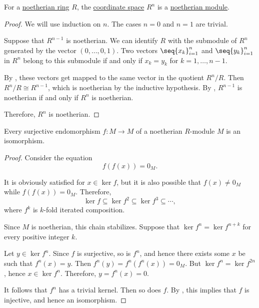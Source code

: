 \begin{proposition}\label{thm:noetherian_free_module}
  For a \hyperref[def:noetherian_semiring]{noetherian ring} \( R \), the \hyperref[def:sequence_space]{coordinate space} \( R^n \) is a \hyperref[def:noetherian_semimodule]{noetherian module}.
\end{proposition}
\begin{proof}
  We will use induction on \( n \). The cases \( n = 0 \) and \( n = 1 \) are trivial.

  Suppose that \( R^{n-1} \) is noetherian. We can identify \( R \) with the submodule of \( R^n \) generated by the vector \( (0, \ldots, 0, 1) \). Two vectors \( \seq{ x_k }_{i=1}^n \) and  \( \seq{ y_k }_{i=1}^n \) in \( R^n \) belong to this submodule if and only if \( x_k = y_k \) for \( k = 1, \ldots, n - 1 \).

  By , these vectors get mapped to the same vector in the quotient \( R^n / R \). Then \( R^n / R \cong R^{n-1} \), which is noetherian by the inductive hypothesis. By , \( R^{n-1} \) is noetherian if and only if \( R^n \) is noetherian.

  Therefore, \( R^n \) is noetherian.
\end{proof}

\begin{lemma}\label{thm:surjective_endomorphism_over_noetherian_module}
  Every surjective endomorphism \( f: M \to M \) of a noetherian \( R \)-module \( M \) is an isomorphism.
\end{lemma}
\begin{proof}
  Consider the equation
  \begin{equation*}
    f(f(x)) = 0_M.
  \end{equation*}

  It is obviously satisfied for \( x \in \ker f \), but it is also possible that \( f(x) \neq 0_M \) while \( f(f(x)) = 0_M \). Therefore,
  \begin{equation*}
    \ker f \subseteq \ker f^2 \subseteq \ker f^3 \subseteq \cdots,
  \end{equation*}
  where \( f^k \) is \( k \)-fold iterated composition.

  Since \( M \) is noetherian, this chain stabilizes. Suppose that \( \ker f^n = \ker f^{n + k} \) for every positive integer \( k \).

  Let \( y \in \ker f^n \). Since \( f \) is surjective, so is \( f^n \), and hence there exists some \( x \) be such that \( f^n(x) = y \). Then \( f^n(y) = f^n(f^n(x)) = 0_M \). But \( \ker f^n = \ker f^{2n} \), hence \( x \in \ker f^n \). Therefore, \( y = f^n(x) = 0 \).

  It follows that \( f^n \) has a trivial kernel. Then so does \( f \). By , this implies that \( f \) is injective, and hence an isomorphism.
\end{proof}

